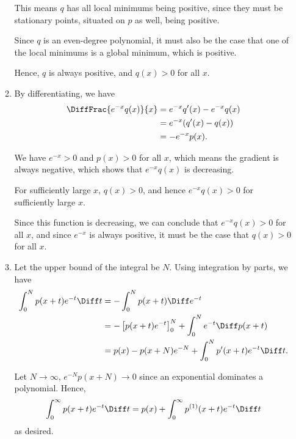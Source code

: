\begin{enumerate}
\begin{enumerate}
                    This means \(q\) has all local minimums being positive, since they must be stationary points, situated on \(p\) as well, being positive.

                    Since \(q\) is an even-degree polynomial, it must also be the case that one of the local minimums is a global minimum, which is positive.

                    Hence, \(q\) is always positive, and \(q(x) > 0\) for all \(x\).

              \item By differentiating, we have
                    \begin{align*}
                        \DiffFrac{e^{-x} q(x)}{x} & = e^{-x} q'(x) - e^{-x} q(x) \\
                                                  & = e^{-x} (q'(x) - q(x))      \\
                                                  & = - e^{-x} p(x).
                    \end{align*}

                    We have \(e^{-x} > 0\) and \(p(x) > 0\) for all \(x\), which means the gradient is always negative, which shows that \(e^{-x} q(x)\) is decreasing.

                    For sufficiently large \(x\), \(q(x) > 0\), and hence \(e^{-x} q(x) > 0\) for sufficiently large \(x\).

                    Since this function is decreasing, we can conclude that \(e^{-x} q(x) > 0\) for all \(x\), and since \(e^{-x}\) is always positive, it must be the case that \(q(x) > 0\) for all \(x\).

              \item Let the upper bound of the integral be \(N\). Using integration by parts, we have
                    \begin{align*}
                        \int_{0}^{N} p(x + t) e^{-t} \Diff t & = - \int_{0}^{N} p(x + t) \Diff e^{-t}                                        \\
                                                             & = - \left[p(x + t) e^{-t}\right]_{0}^{N} + \int_{0}^{N} e^{-t} \Diff p(x + t) \\
                                                             & = p(x) - p(x + N) e^{-N} + \int_{0}^{N} p'(x + t) e^{-t} \Diff t.
                    \end{align*}

                    Let \(N \to \infty\), \(e^{-N} p(x + N) \to 0\) since an exponential dominates a polynomial. Hence,
                    \[
                        \int_{0}^{\infty} p(x + t) e^{-t} \Diff t = p(x) + \int_{0}^{\infty} p^{(1)} (x + t) e^{-t} \Diff t
                    \]
                    as desired.


\end{enumerate}
\end{enumerate}
